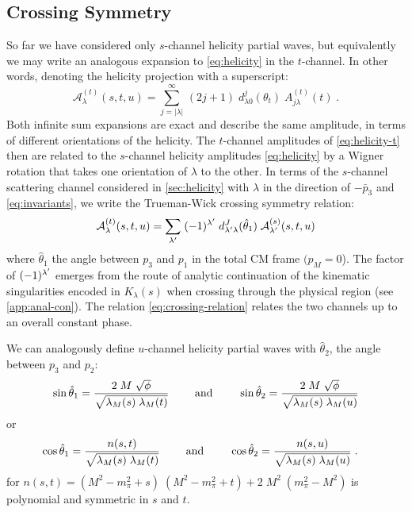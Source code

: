 \subsection{Crossing Symmetry}
 So far we have considered only \(s\)-channel helicity partial waves, but equivalently we may write an analogous expansion to \cref{eq:helicity} in the \(t\)-channel. In other words, denoting the helicity projection with a superscript:
 \begin{equation}
   \label{eq:helicity-t}
   \mathcal{A}^{(t)}_\lambda(s, t, u) = \sum_{j = |\lambda|}^\infty \, (2j+1) \; d^{j}_{\lambda0}(\theta_t) \; A^{(t)}_{j\lambda}(t) \; .
 \end{equation}
Both infinite sum expansions are exact and describe the same amplitude, in terms of different orientations of the helicity. The \(t\)-channel amplitudes of \cref{eq:helicity-t} then are related to the \(s\)-channel helicity amplitudes \cref{eq:helicity} by a Wigner rotation that takes one orientation of \(\lambda\) to the other.
In terms of the \(s\)-channel scattering channel considered in \cref{sec:helicity} with \(\lambda\) in the direction of \(-\bar{p}_3\) and \cref{eq:invariants}, we write the Trueman-Wick crossing symmetry relation:
  \begin{equation}
    \label{eq:crossing-relation}
    \mathcal{A}_\lambda^{(t)}(s, t, u) = \sum_{\lambda^\prime} \;  (-1)^{\lambda^\prime} \;d_{\lambda^\prime \lambda}^J(\hat{\theta}_1) \; \mathcal{A}_{\lambda^\prime}^{(s)}(s,t,u)
  \end{equation}
where \(\hat{\theta}_1\) the angle between \(p_3\) and \(p_1\) in the total CM frame \((p_M = 0\)). The factor of \((-1)^{\lambda^\prime}\) emerges from the route of analytic continuation of the kinematic singularities encoded in \(K_\lambda(s)\) when crossing through the physical region (see \cref{app:anal-con}). The relation \cref{eq:crossing-relation} relates the two channels up to an overall constant phase.

 We can analogously define \(u\)-channel helicity partial waves with \(\hat{\theta}_2\), the angle between \(p_3\) and \(p_2\):
  \begin{align} \label{sin-hat}
    \sin\hat{\theta}_1 = \frac{
    2 \; M \; \sqrt{\phi}
    }{
    \sqrt{\lambda_M(s) \;  \lambda_M(t)}
    }
    \qquad \text{ and } \qquad
    \sin\hat{\theta}_2 = \frac{
    2 \; M \; \sqrt{\phi}
    }{
    \sqrt{\lambda_M(s) \;  \lambda_M(u)}
    }
  \end{align}
or
  \begin{align} \label{cos-hat}
    \cos\hat{\theta}_1 &= \frac{n(s,t)}
    {\sqrt{\lambda_M(s) \; \lambda_M(t)}} \qquad \text{ and } \qquad
    \cos\hat{\theta}_2 = \frac{n(s,u)}
    {\sqrt{\lambda_M(s) \; \lambda_M(u)}} \; .
  \end{align}
for \(n(s,t) =  (M^2 - m_\pi^2 + s) \; (M^2 - m_\pi^2  + t)  + 2 \; M^2 \; (m_\pi^2 -M^2)\) is polynomial and symmetric in \(s\) and \(t\).

